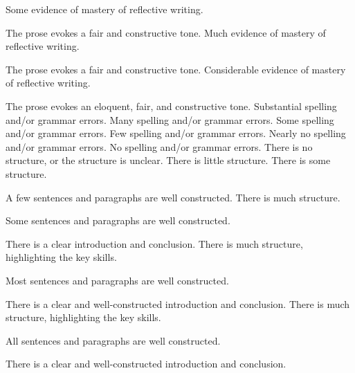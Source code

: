 \documentclass{../fal_assignment}
\begin{document}
\begin{markingrubric}
        \grade 		Some evidence of mastery of reflective writing.
         \par 		The prose evokes a fair and constructive tone.
        \grade 		Much evidence of mastery of reflective writing.
         \par 		The prose evokes a fair and constructive tone.
        \grade 		Considerable evidence of mastery of reflective writing.
        \par 		The prose evokes an eloquent, fair, and constructive tone.
%
        \grade\fail 	Substantial spelling and/or grammar errors.
        \grade 		Many spelling and/or grammar errors.
        \grade 		Some spelling and/or grammar errors.  
        \grade 		Few spelling and/or grammar errors.
        \grade 		Nearly no spelling and/or grammar errors.
        \grade 		No spelling and/or grammar errors.
%
        \grade\fail 	There is no structure, or the structure is unclear.
        \grade 		There is little structure.
        \grade 		There is some structure.
        \par 		A few sentences and paragraphs are well constructed.
        \grade 		There is much structure.
        \par 		Some sentences and paragraphs are well constructed.
        \par 		There is a clear introduction and conclusion.
        \grade 		There is much structure, highlighting the key skills.
        \par 		Most sentences and paragraphs are well constructed.
        \par 		There is a clear and well-constructed introduction and conclusion.
        \grade 		There is much structure, highlighting the key skills.
        \par 		All sentences and paragraphs are well constructed.
        \par 		There is a clear and well-constructed introduction and conclusion.
\end{markingrubric}
\end{document}
